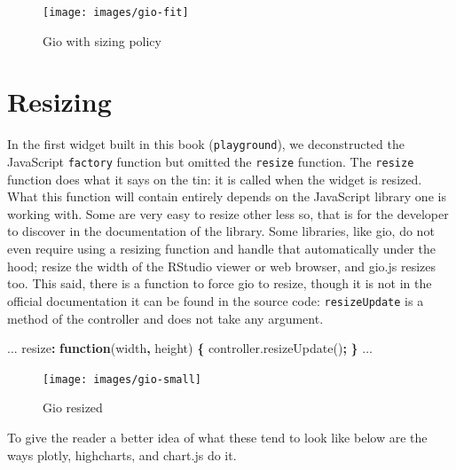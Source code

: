 \documentclass[10pt,]{krantz}
\makeatletter
\newenvironment{Shaded}{\begin{snugshade}}{\end{snugshade}}
\newcommand{\AttributeTok}[1]{\textcolor[rgb]{0.61,0.61,0.61}{#1}}
\newcommand{\KeywordTok}[1]{\textcolor[rgb]{0.27,0.27,0.27}{\textbf{#1}}}
\newcommand{\NormalTok}[1]{#1}
\newcommand{\OperatorTok}[1]{\textcolor[rgb]{0.43,0.43,0.43}{\textbf{#1}}}
\newcommand{\VariableTok}[1]{\textcolor[rgb]{0,0,0}{#1}}
\newenvironment{kframe}{%
\medskip{}
\setlength{\fboxsep}{.8em}
 \def\at@end@of@kframe{}%
 \ifinner\ifhmode%
  \def\at@end@of@kframe{\end{minipage}}%
  \begin{minipage}{\columnwidth}%
 \fi\fi%
 \def\FrameCommand##1{\hskip\@totalleftmargin \hskip-\fboxsep
 \colorbox{shadecolor}{##1}\hskip-\fboxsep
     \hskip-\linewidth \hskip-\@totalleftmargin \hskip\columnwidth}%
 \MakeFramed {\advance\hsize-\width
   \@totalleftmargin\z@ \linewidth\hsize
   \@setminipage}}%
 {\par\unskip\endMakeFramed%
 \at@end@of@kframe}
\renewenvironment{Shaded}{\begin{kframe}}{\end{kframe}}
\makeatother
\begin{document}
\begin{figure}[H]

{\centering \texttt{[image: images/gio-fit]} 

}

\caption{Gio with sizing policy}\label{fig:gio-fit}
\end{figure}

\hypertarget{widgets-adv-resizing}{%
\section{Resizing}\label{widgets-adv-resizing}}

In the first widget built in this book (\texttt{playground}), we deconstructed the JavaScript \texttt{factory} function but omitted the \texttt{resize} function. The \texttt{resize} function does what it says on the tin: it is called when the widget is resized. What this function will contain entirely depends on the JavaScript library one is working with. Some are very easy to resize other less so, that is for the developer to discover in the documentation of the library. Some libraries, like gio, do not even require using a resizing function and handle that automatically under the hood; resize the width of the RStudio viewer or web browser, and gio.js resizes too. This said, there is a function to force gio to resize, though it is not in the official documentation it can be found in the source code: \texttt{resizeUpdate} is a method of the controller and does not take any argument.

\begin{Shaded}
\begin{Highlighting}[]
\NormalTok{...}
\NormalTok{resize}\OperatorTok{:} \KeywordTok{function}\NormalTok{(width}\OperatorTok{,}\NormalTok{ height) }\OperatorTok{\{}
  \VariableTok{controller}\NormalTok{.}\AttributeTok{resizeUpdate}\NormalTok{()}\OperatorTok{;}
\OperatorTok{\}}
\NormalTok{...}
\end{Highlighting}
\end{Shaded}

\begin{figure}[H]

{\centering \texttt{[image: images/gio-small]} 

}

\caption{Gio resized}\label{fig:gio-small}
\end{figure}

To give the reader a better idea of what these tend to look like below are the ways plotly, highcharts, and chart.js do it.
\end{document}
